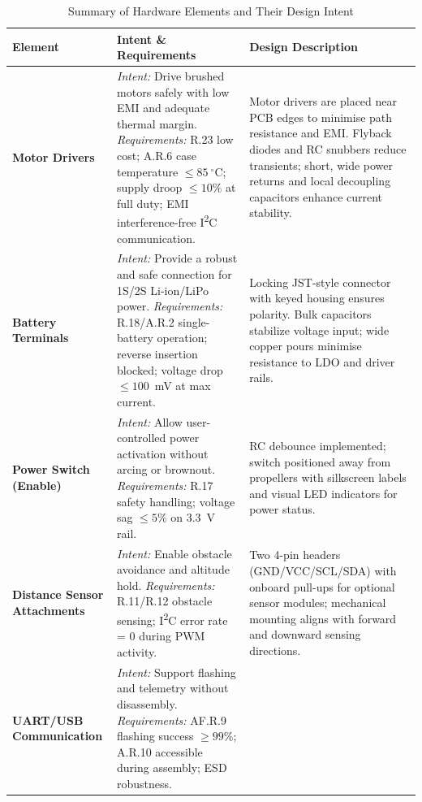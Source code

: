 \begin{longtable}{@{}p{2cm} p{6.9cm} p{6.9cm}@{}}
\caption{Summary of Hardware Elements and Their Design Intent}
\label{tab:hardware-elements} \\
\toprule
\textbf{Element} & \textbf{Intent \& Requirements} & \textbf{Design Description} \\ 
\midrule
\textbf{Motor Drivers} &
\textit{Intent:} Drive brushed motors safely with low EMI and adequate thermal margin. \newline
\textit{Requirements:} R.23 low cost; A.R.6 case temperature $\leq 85~^{\circ}$C; supply droop $\leq 10\%$ at full duty; EMI interference-free I\textsuperscript{2}C communication. &
Motor drivers are placed near PCB edges to minimise path resistance and EMI. Flyback diodes and RC snubbers reduce transients; short, wide power returns and local decoupling capacitors enhance current stability. \\ 
\midrule
\textbf{Battery Terminals} &
\textit{Intent:} Provide a robust and safe connection for 1S/2S Li-ion/LiPo power. \newline
\textit{Requirements:} R.18/A.R.2 single-battery operation; reverse insertion blocked; voltage drop $\leq 100$~mV at max current. &
Locking JST-style connector with keyed housing ensures polarity. Bulk capacitors stabilize voltage input; wide copper pours minimise resistance to LDO and driver rails. \\ 
\midrule
\textbf{Power Switch (Enable)} &
\textit{Intent:} Allow user-controlled power activation without arcing or brownout. \newline
\textit{Requirements:} R.17 safety handling; voltage sag $\leq 5\%$ on 3.3~V rail. &
RC debounce implemented; switch positioned away from propellers with silkscreen labels and visual LED indicators for power status. \\ 
\midrule
\textbf{Distance Sensor Attachments} &
\textit{Intent:} Enable obstacle avoidance and altitude hold. \newline
\textit{Requirements:} R.11/R.12 obstacle sensing; I\textsuperscript{2}C error rate = 0 during PWM activity. &
Two 4-pin headers (GND/VCC/SCL/SDA) with onboard pull-ups for optional sensor modules; mechanical mounting aligns with forward and downward sensing directions. \\ 
\midrule
\textbf{UART/USB Communication} &
\textit{Intent:} Support flashing and telemetry without disassembly. \newline
\textit{Requirements:} AF.R.9 flashing success $\geq 99\%$; A.R.10 accessible during assembly; ESD robustness. &

\end{longtable}
